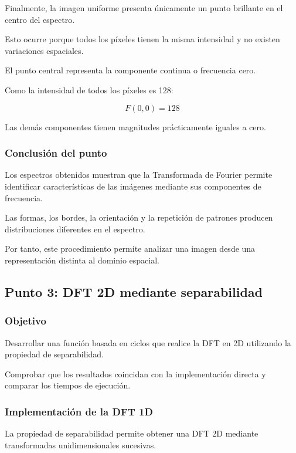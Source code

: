 \documentclass[11pt,letterpaper]{article}
\begin{document}
Finalmente, la imagen uniforme presenta
únicamente un punto brillante en el centro
del espectro.

Esto ocurre porque todos los píxeles
tienen la misma intensidad y no existen
variaciones espaciales.

El punto central representa la componente
continua o frecuencia cero.

Como la intensidad de todos los píxeles
es 128:

\[
F(0,0)=128
\]

Las demás componentes tienen magnitudes
prácticamente iguales a cero.

\subsubsection*{Conclusión del punto}

Los espectros obtenidos muestran que
la Transformada de Fourier permite identificar
características de las imágenes mediante
sus componentes de frecuencia.

Las formas, los bordes, la orientación
y la repetición de patrones producen
distribuciones diferentes en el espectro.

Por tanto, este procedimiento permite
analizar una imagen desde una representación
distinta al dominio espacial.

\subsection{Punto 3: DFT 2D mediante separabilidad}

\subsubsection*{Objetivo}

Desarrollar una función basada en ciclos
que realice la DFT en 2D utilizando
la propiedad de separabilidad.

Comprobar que los resultados coincidan
con la implementación directa
y comparar los tiempos de ejecución.

\subsubsection*{Implementación de la DFT 1D}

La propiedad de separabilidad permite
obtener una DFT 2D mediante transformadas
unidimensionales sucesivas.
\end{document}
